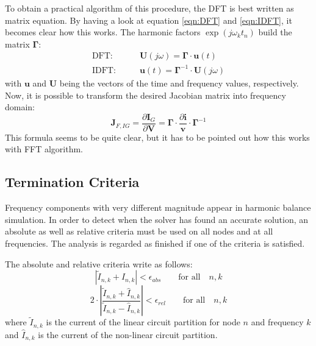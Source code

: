 \addvspace{12pt}

To obtain a practical algorithm of this procedure, the DFT is best written
as matrix equation. By having a look at equation \ref{eqn:DFT} and
\ref{eqn:IDFT}, it becomes clear how this works. The harmonic factors
$\exp(j\omega_k t_n)$ build the matrix $\boldsymbol{\Gamma}$:
\begin{align}
\text{DFT:}  \qquad & \boldsymbol{U}(j\omega) = \boldsymbol{\Gamma}\cdot \boldsymbol{u}(t) \\
\text{IDFT:} \qquad & \boldsymbol{u}(t) = \boldsymbol{\Gamma}^{-1}\cdot \boldsymbol{U}(j\omega)
\end{align}
with $\boldsymbol{u}$ and $\boldsymbol{U}$ being the vectors of the time
and frequency values, respectively. Now, it is possible to transform the
desired Jacobian matrix into frequency domain:
\begin{equation}
\boldsymbol{J}_{F,IG} = \frac{\partial\boldsymbol{I}_G}{\partial\boldsymbol{V}}
  = \boldsymbol{\Gamma}\cdot\frac{\partial\boldsymbol{i}}{\boldsymbol{v}}
    \cdot\boldsymbol{\Gamma}^{-1}
\end{equation}
This formula seems to be quite clear, but it has to be pointed out how
this works with FFT algorithm.


\subsection{Termination Criteria}

Frequency components with very different magnitude appear in harmonic
balance simulation. In order to detect when the solver has found an
accurate solution, an absolute as well as relative criteria must be
used on all nodes and at all frequencies. The analysis is regarded as
finished if one of the criteria is satisfied.

\addvspace{12pt}

The absolute and relative criteria write as follows:
\begin{equation}
\left| \tilde{I}_{n,k} + \hat{I}_{n,k} \right| < \epsilon_{abs}
  \qquad \text{for all} \quad n, k
\end{equation}
\begin{equation}
2\cdot \left| \frac{\tilde{I}_{n,k} + \hat{I}_{n,k}}
                   {\tilde{I}_{n,k} - \hat{I}_{n,k}} \right|
  < \epsilon_{rel}  \qquad \text{for all} \quad n, k
\end{equation}
where $\tilde{I}_{n,k}$ is the current of the linear circuit
partition for node $n$ and frequency $k$ and $\hat{I}_{n,k}$
is the current of the non-linear circuit partition.


